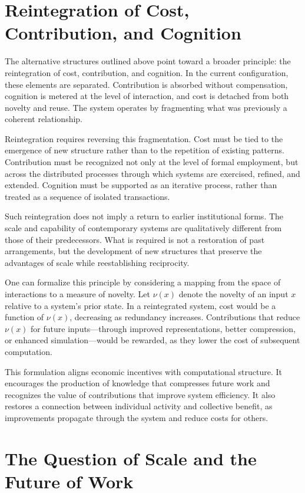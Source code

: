 \documentclass[12pt, oneside]{article}
\begin{document}
\section{Reintegration of Cost, Contribution, and Cognition}

The alternative structures outlined above point toward a broader principle: the reintegration of cost, contribution, and cognition. In the current configuration, these elements are separated. Contribution is absorbed without compensation, cognition is metered at the level of interaction, and cost is detached from both novelty and reuse. The system operates by fragmenting what was previously a coherent relationship.

Reintegration requires reversing this fragmentation. Cost must be tied to the emergence of new structure rather than to the repetition of existing patterns. Contribution must be recognized not only at the level of formal employment, but across the distributed processes through which systems are exercised, refined, and extended. Cognition must be supported as an iterative process, rather than treated as a sequence of isolated transactions.

Such reintegration does not imply a return to earlier institutional forms. The scale and capability of contemporary systems are qualitatively different from those of their predecessors. What is required is not a restoration of past arrangements, but the development of new structures that preserve the advantages of scale while reestablishing reciprocity.

One can formalize this principle by considering a mapping from the space of interactions to a measure of novelty. Let $\nu(x)$ denote the novelty of an input $x$ relative to a system's prior state. In a reintegrated system, cost would be a function of $\nu(x)$, decreasing as redundancy increases. Contributions that reduce $\nu(x)$ for future inputs---through improved representations, better compression, or enhanced simulation---would be rewarded, as they lower the cost of subsequent computation.

This formulation aligns economic incentives with computational structure. It encourages the production of knowledge that compresses future work and recognizes the value of contributions that improve system efficiency. It also restores a connection between individual activity and collective benefit, as improvements propagate through the system and reduce costs for others.

\section{The Question of Scale and the Future of Work}
\end{document}
